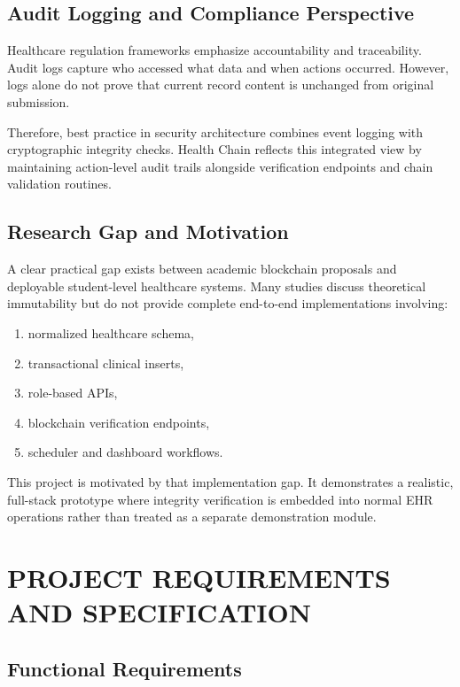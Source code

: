 \documentclass[12pt,a4paper]{report}
\begin{document}
\section{Audit Logging and Compliance Perspective}

Healthcare regulation frameworks emphasize accountability and traceability. Audit logs capture who accessed what data and when actions occurred. However, logs alone do not prove that current record content is unchanged from original submission.

Therefore, best practice in security architecture combines event logging with cryptographic integrity checks. Health Chain reflects this integrated view by maintaining action-level audit trails alongside verification endpoints and chain validation routines.

\section{Research Gap and Motivation}

A clear practical gap exists between academic blockchain proposals and deployable student-level healthcare systems. Many studies discuss theoretical immutability but do not provide complete end-to-end implementations involving:

\begin{enumerate}
\item normalized healthcare schema,
\item transactional clinical inserts,
\item role-based APIs,
\item blockchain verification endpoints,
\item scheduler and dashboard workflows.
\end{enumerate}

This project is motivated by that implementation gap. It demonstrates a realistic, full-stack prototype where integrity verification is embedded into normal EHR operations rather than treated as a separate demonstration module.

\chapter{PROJECT REQUIREMENTS AND SPECIFICATION}

\section{Functional Requirements}
\end{document}
